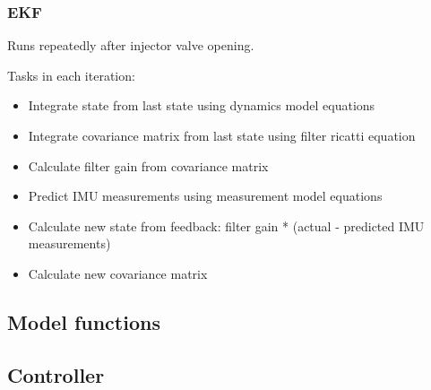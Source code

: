 \subsubsection{EKF}
Runs repeatedly after injector valve opening.

Tasks in each iteration:
\begin{itemize}
    \item Integrate state from last state using dynamics model equations
    \item Integrate covariance matrix from last state using filter ricatti equation 
    \item Calculate filter gain from covariance matrix
    \item Predict IMU measurements using measurement model equations
    \item Calculate new state from feedback: filter gain * (actual - predicted IMU measurements)
    \item Calculate new covariance matrix
\end{itemize}

\subsection{Model functions}

\subsection{Controller}